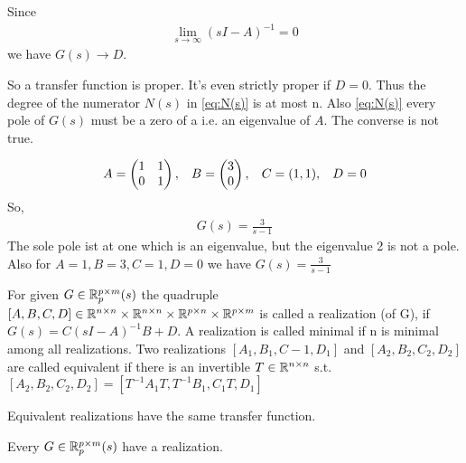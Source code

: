 Since 
\begin{align*}
	\lim\limits_{s \rightarrow \infty} (sI -A)^{-1} =0
\end{align*}
we have $G(s) \rightarrow D$.

So a transfer function is proper. It's even strictly proper if $D=0$. Thus the degree of the numerator $N(s)$ in \ref{eq:N(s)} is at most n. Also \ref{eq:N(s)} every pole of $G(s)$ must be a zero of a i.e. an eigenvalue of $A$. The converse is not true. 

\begin{exa}
	\begin{align*}
		A=\begin{pmatrix}
		1 & 1 \\ 0  & 1 
		\end{pmatrix}
		, \hspace{2ex}
		B = \begin{pmatrix}
		3 \\ 0
		\end{pmatrix}, \hspace{2ex}
		C=(1,1), \hspace{2ex} D=0 
	\end{align*}
	So,
	\begin{align*}
		G(s)=\frac{3}{s-1}
	\end{align*}
	The sole pole ist at one which is an eigenvalue, but the eigenvalue 2 is not a pole. Also for $A=1, B=3, C=1, D=0$ we have $G(s)=\frac{3}{s-1}$
\end{exa} 

\begin{defi}
	For given $G \in \mathbb{R}^{p \times m}_p(s)$ the quadruple $[A,B,C,D] \in \mathbb{R}^{n \times n} \times \mathbb{R}^{n \times n} \times \mathbb{R}^{p \times n} \times \mathbb{R}^{p \times m}$ is called a realization (of G), if $G(s)=C(sI-A)^{-1}B + D $. A realization is called minimal if n is minimal among all realizations. Two realizations $[A_1,B_1,C-1,D_1]$ and $[A_2,B_2,C_2,D_2]$  are called equivalent if there is an invertible $T \in \mathbb{R}^{n \times n}$ s.t. $[A_2,B_2,C_2,D_2]= [T^{-1}A_1 T, T^{-1}B_1,C_1T,D_1]$
\end{defi}

\begin{thm}
	Equivalent realizations have the same transfer function. 
\end{thm}

\begin{thm}
	Every $G \in \mathbb{R}^{p \times m}_p(s)$ have a realization. 
\end{thm}
